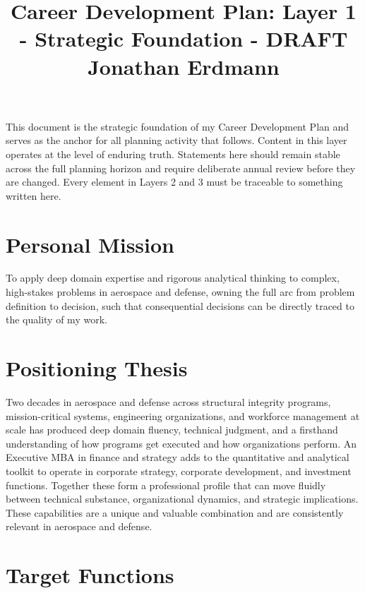 \documentclass{article}
\title{Career Development Plan: Layer 1 - Strategic Foundation - DRAFT \\ [1em]
	\large Jonathan Erdmann \\ [1em]
}
\begin{document}
\maketitle

This document is the strategic foundation of my Career Development Plan and serves as the anchor for all planning activity that 
follows. Content in this layer operates at the level of enduring truth.
Statements here should remain stable across the full planning horizon and require deliberate annual review before they are changed.
Every element in Layers 2 and 3 must be traceable to something written here.

\section{Personal Mission}

To apply deep domain expertise and rigorous analytical thinking to complex, high-stakes problems in aerospace and defense, 
owning the full arc from problem definition to decision, such that consequential decisions can be directly traced to the 
quality of my work.

\section{Positioning Thesis}

Two decades in aerospace and defense across structural integrity programs, mission-critical systems, engineering organizations,
and workforce management at scale has produced deep domain fluency, technical judgment, and a firsthand understanding of how
programs get executed and how organizations perform. An Executive MBA in finance and strategy adds to the quantitative and analytical
toolkit to operate in corporate strategy, corporate development, and investment functions. Together these form a professional profile
that can move fluidly between technical substance, organizational dynamics, and strategic implications. These capabilities 
are a unique and valuable combination and are consistently relevant in aerospace and defense.

\section{Target Functions}

\end{document}
